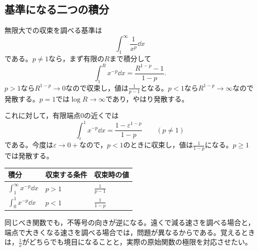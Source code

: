 \subsection{基準になる二つの積分}

無限大での収束を調べる基準は
\[
 \int_1^{\infty}\frac1{x^p}\dd x
\]
である。$p\ne1$なら，まず有限の$R$まで積分して
\[
 \int_1^R x^{-p}\dd x=\frac{R^{1-p}-1}{1-p}.
\]
$p>1$なら$R^{1-p}\to0$なので収束し，値は$\frac1{p-1}$となる。$p<1$なら$R^{1-p}\to\infty$なので発散する。$p=1$では$\log R\to\infty$であり，やはり発散する。

これに対して，有限端点$0$の近くでは
\[
 \int_{\varepsilon}^{1}x^{-p}\dd x
 =\frac{1-\varepsilon^{1-p}}{1-p}\qquad(p\ne1)
\]
である。今度は$\varepsilon\to0+$なので，$p<1$のときに収束し，値は$\frac1{1-p}$になる。$p\geq1$では発散する。

\begin{center}
\begin{tabular}{lll}
\toprule
積分 & 収束する条件 & 収束時の値\\
\midrule
$\int_1^{\infty}x^{-p}\dd x$ & $p>1$ & $\frac1{p-1}$\\[4pt]
$\int_0^1x^{-p}\dd x$ & $p<1$ & $\frac1{1-p}$\\
\bottomrule
\end{tabular}
\end{center}

同じべき関数でも，不等号の向きが逆になる。遠くで減る速さを調べる場合と，端点で大きくなる速さを調べる場合では，問題が異なるからである。覚えるときは，$\frac1x$がどちらでも境目になることと，実際の原始関数の極限を対応させたい。

